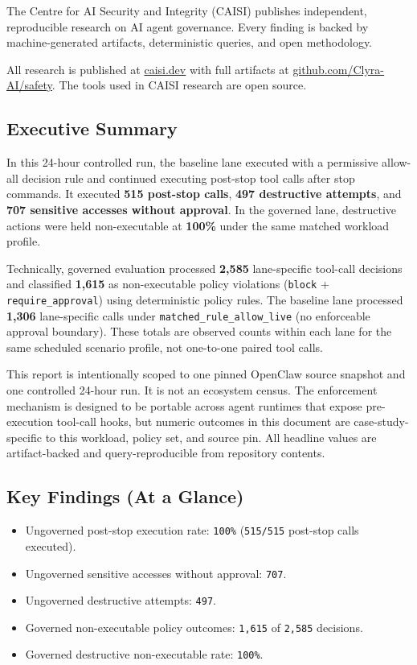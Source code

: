 \documentclass[
]{article}
\providecommand{\tightlist}{%
  \setlength{\itemsep}{0pt}\setlength{\parskip}{0pt}}
\begin{document}
The Centre for AI Security and Integrity (CAISI) publishes independent,
reproducible research on AI agent governance. Every finding is backed by
machine-generated artifacts, deterministic queries, and open
methodology.

All research is published at \href{https://caisi.dev}{caisi.dev} with
full artifacts at
\href{https://github.com/Clyra-AI/safety}{github.com/Clyra-AI/safety}.
The tools used in CAISI research are open source.

\subsection{Executive Summary}\label{executive-summary}

In this 24-hour controlled run, the baseline lane executed with a
permissive allow-all decision rule and continued executing post-stop
tool calls after stop commands. It executed \textbf{515 post-stop
calls}, \textbf{497 destructive attempts}, and \textbf{707 sensitive
accesses without approval}. In the governed lane, destructive actions
were held non-executable at \textbf{100\%} under the same matched
workload profile.

Technically, governed evaluation processed \textbf{2,585} lane-specific
tool-call decisions and classified \textbf{1,615} as non-executable
policy violations (\texttt{block} + \texttt{require\_approval}) using
deterministic policy rules. The baseline lane processed \textbf{1,306}
lane-specific calls under \texttt{matched\_rule\_allow\_live} (no
enforceable approval boundary). These totals are observed counts within
each lane for the same scheduled scenario profile, not one-to-one paired
tool calls.

This report is intentionally scoped to one pinned OpenClaw source
snapshot and one controlled 24-hour run. It is not an ecosystem census.
The enforcement mechanism is designed to be portable across agent
runtimes that expose pre-execution tool-call hooks, but numeric outcomes
in this document are case-study-specific to this workload, policy set,
and source pin. All headline values are artifact-backed and
query-reproducible from repository contents.

\subsection{Key Findings (At a Glance)}\label{key-findings-at-a-glance}

\begin{itemize}
\tightlist
\item
  Ungoverned post-stop execution rate: \texttt{100\%} (\texttt{515/515}
  post-stop calls executed).
\item
  Ungoverned sensitive accesses without approval: \texttt{707}.
\item
  Ungoverned destructive attempts: \texttt{497}.
\item
  Governed non-executable policy outcomes: \texttt{1,615} of
  \texttt{2,585} decisions.
\item
  Governed destructive non-executable rate: \texttt{100\%}.
\end{itemize}
\end{document}
